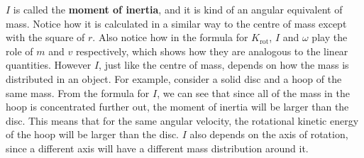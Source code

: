 \documentclass[../classical_mechanics.tex]{subfiles}
\begin{document}
        $I$ is called the \textbf{moment of inertia}, and it is kind of an angular equivalent of mass.
        Notice how it is calculated in a similar way to the centre of mass except with the square of $r$.
        Also notice how in the formula for $K_\text{rot}$, $I$ and $\omega$ play the role of $m$ and $v$ respectively, which shows how they are analogous to the linear quantities.
        However $I$, just like the centre of mass, depends on how the mass is distributed in an object.
        For example, consider a solid disc and a hoop of the same mass.
        From the formula for $I$, we can see that since all of the mass in the hoop is concentrated further out, the moment of inertia will be larger than the disc.
        This means that for the same angular velocity, the rotational kinetic energy of the hoop will be larger than the disc.
        $I$ also depends on the axis of rotation, since a different axis will have a different mass distribution around it.
\end{document}
